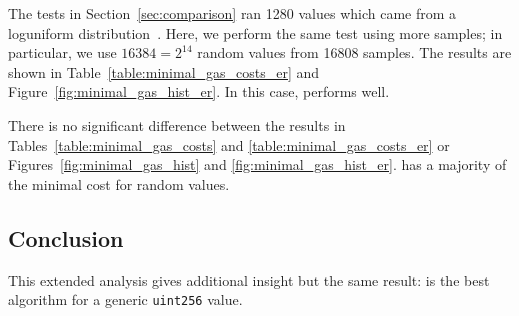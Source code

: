 The tests in Section~\ref{sec:comparison} ran 1280 values
which came from a loguniform distribution~\cite{ScipyLoguniform}.
Here, we perform the same test using more samples;
in particular, we use $16384 = 2^{14}$ random values from 16808 samples.
The results are shown in Table~\ref{table:minimal_gas_costs_er}
and Figure~\ref{fig:minimal_gas_hist_er}.
In this case, \UnrolledThree{} performs well.

There is no significant difference between the results in 
Tables~\ref{table:minimal_gas_costs} and \ref{table:minimal_gas_costs_er}
or Figures~\ref{fig:minimal_gas_hist} and \ref{fig:minimal_gas_hist_er}.
\UnrolledThree{} has a majority of the minimal cost for random values.




\subsection{Conclusion}

This extended analysis gives additional insight but the same result:
\UnrolledThree{} is the best algorithm
for a generic \texttt{uint256} value.
